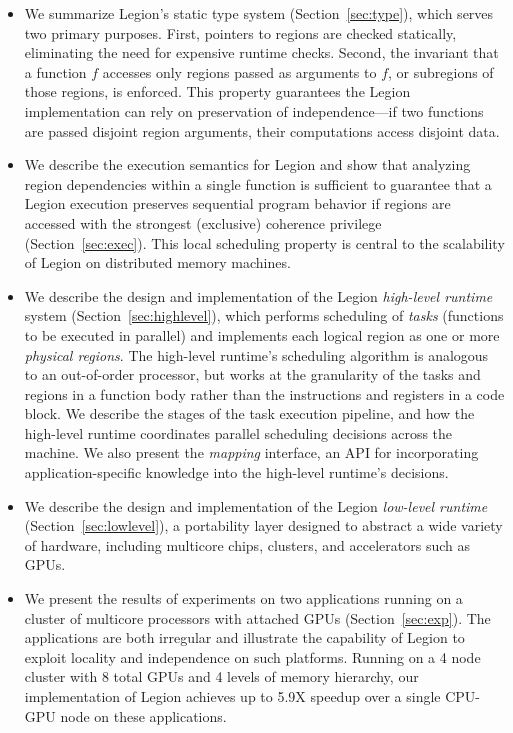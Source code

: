 \documentclass[conference]{IEEEtran}
\begin{document}
\begin{itemize}

\item We summarize Legion's static type system (Section~\ref{sec:type}), which serves two primary
  purposes.  First, pointers to regions are checked
  statically, eliminating the need for expensive runtime checks.
  Second, the invariant that a function $f$ accesses only
  regions passed as arguments to $f$, or subregions of those regions, is enforced.
  This property guarantees the Legion implementation can rely on
  preservation of independence---if two functions are passed disjoint
  region arguments, their computations access disjoint
data.  

\item We describe the execution semantics for Legion and show that
analyzing region dependencies within a single function is sufficient to 
guarantee that a Legion execution preserves sequential program
behavior if regions are accessed with the strongest (exclusive)
coherence privilege (Section~\ref{sec:exec}).  This local scheduling property is central to 
the scalability of Legion on distributed memory machines.

\item We describe the design and implementation of the Legion {\em high-level runtime}
system (Section~\ref{sec:highlevel}), which performs scheduling of {\em tasks} (functions to be executed in parallel)
and implements each logical region as one or more {\em physical regions}.
The high-level runtime's scheduling algorithm is analogous to an out-of-order processor,
but works at the granularity of the tasks and regions in a function body rather than the instructions and registers
in a code block.  We describe the stages of the task execution pipeline, and how the high-level runtime coordinates parallel
scheduling decisions across the machine.  We also present the {\em mapping} interface, an API for incorporating
application-specific knowledge into the high-level runtime's decisions.

\item We describe the design and implementation of the Legion {\em low-level runtime} (Section~\ref{sec:lowlevel}),
a portability layer designed to abstract a wide variety of hardware, including multicore chips, clusters, and accelerators
such as GPUs. 

\item We present the results of experiments on two applications running on a cluster of multicore processors with
attached GPUs (Section~\ref{sec:exp}).  The applications are both irregular and illustrate the capability of Legion to 
exploit locality and independence on such platforms.
Running on a 4 node cluster with 8 total GPUs 
and 4 levels of memory hierarchy, our implementation of Legion 
achieves up to 5.9X speedup over a single CPU-GPU node on these applications.

\end{itemize}
%

%

%
%

%
%

%
%
%
%

{
\tiny

}
\end{document}
